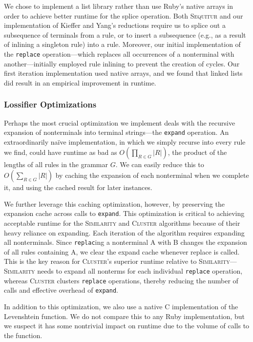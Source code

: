 \documentclass[11pt]{article}
\newcommand{\Sequitur}{\textsc{Sequitur}\xspace}
\newcommand{\Similarity}{\textsc{Similarity}\xspace}
\newcommand{\Cluster}{\textsc{Cluster}\xspace}
\begin{document}
We chose to implement a list library rather than use Ruby's native arrays in
order to achieve better runtime for the splice operation.  Both \Sequitur and
our implementation of Kieffer and Yang's reductions require us to splice out a
subsequence of terminals from a rule, or to insert a subsequence (e.g., as a
result of inlining a singleton rule) into a rule.  Moreover, our initial
implementation of the \texttt{replace} operation---which replaces all
occurrences of a nonterminal with another---initially employed rule inlining to
prevent the creation of cycles.  Our first iteration implementation used native
arrays, and we found that linked lists did result in an empirical improvement
in runtime.

\subsubsection{Lossifier Optimizations}

Perhaps the most crucial optimization we implement deals with the recursive
expansion of nonterminals into terminal strings---the \texttt{expand}
operation.  An extraordinarily na\"ive implementation, in which we simply
recurse into every rule we find, could have runtime as bad as $O(\prod_{R \in
G} |R|)$, the product of the lengths of all rules in the grammar $G$.  We can
easily reduce this to $O(\sum_{R \in G} |R|)$ by caching the expansion of each
nonterminal when we complete it, and using the cached result for later
instances.

We further leverage this caching optimization, however, by preserving the
expansion cache across calls to \texttt{expand}.  This optimization is critical
to achieving acceptable runtime for the \Similarity and \Cluster algorithms
because of their heavy reliance on expanding.  Each iteration of the algorithm
requires expanding all nonterminals.  Since \texttt{replac}ing a nonterminal A
with B changes the expansion of all rules containing A, we clear the expand
cache whenever replace is called.  This is the key reason for \Cluster's
superior runtime relative to \Similarity---\Similarity needs to expand all
nonterms for each individual \texttt{replace} operation, whereas \Cluster
clusters \texttt{replace} operations, thereby reducing the number of calls and
effective overhead of \texttt{expand}.

In addition to this optimization, we also use a native C implementation of the
Levenshtein function.  We do not compare this to any Ruby implementation, but
we suspect it has some nontrivial impact on runtime due to the volume of calls
to the function.
\end{document}
